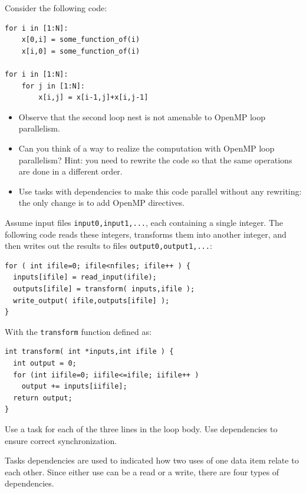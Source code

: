 \begin{exercise}
Consider the following code:
\begin{lstlisting}[language=omp]
for i in [1:N]:
    x[0,i] = some_function_of(i)
    x[i,0] = some_function_of(i)

for i in [1:N]:
    for j in [1:N]:
        x[i,j] = x[i-1,j]+x[i,j-1]
\end{lstlisting}
\begin{itemize}
\item Observe that the second loop nest is not amenable to OpenMP loop
  parallelism.
\item Can you think of a way to realize the computation with OpenMP
  loop parallelism? Hint: you need to rewrite the code so that the
  same operations are done in a different order.
\item Use tasks with dependencies to make this code parallel without
  any rewriting: the only change is to add OpenMP directives.
\end{itemize}
\end{exercise}

\begin{exercise}
  \label{ex:taskio}
  Assume input files \lstinline[language=shell]{input0,input1,...},
  each containing a single integer.
  The following code reads these integers, transforms them into another integer,
  and then writes out the results to files
  \lstinline[language=shell]{output0,output1,...}:
\begin{lstlisting}
for ( int ifile=0; ifile<nfiles; ifile++ ) {
  inputs[ifile] = read_input(ifile);
  outputs[ifile] = transform( inputs,ifile );
  write_output( ifile,outputs[ifile] );
}
\end{lstlisting}
  With the \lstinline{transform} function defined as:
\begin{lstlisting}
int transform( int *inputs,int ifile ) {
  int output = 0;
  for (int iifile=0; iifile<=ifile; iifile++ )
    output += inputs[iifile];
  return output;
}
\end{lstlisting}
Use a task for each of the three lines in the loop body.
Use dependencies to ensure correct synchronization.
\end{exercise}

Tasks dependencies are used to indicated how two uses of one data item
relate to each other. Since either use can be a read or a write,
there are four types of dependencies.

